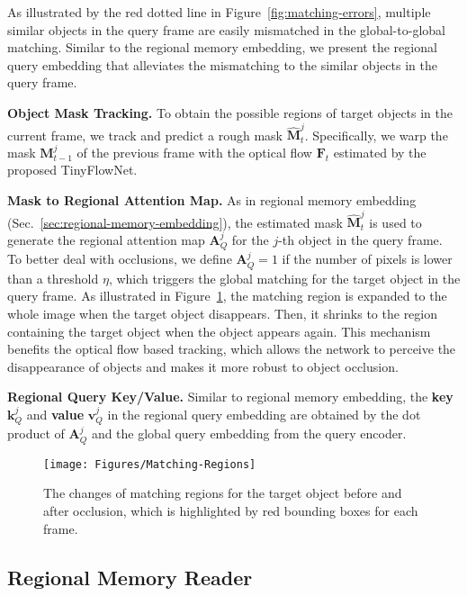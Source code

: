 \documentclass[final]{cvpr}
\begin{document}
As illustrated by the red dotted line in Figure~\ref{fig:matching-errors}, multiple similar objects in the query frame are easily mismatched in the global-to-global matching.
Similar to the regional memory embedding, we present the regional query embedding that alleviates the mismatching  to the similar objects in the query frame.

\noindent \textbf{Object Mask Tracking.}
To obtain the possible regions of target objects in the current frame, we track and predict a rough mask $\mathbf{\hat{M}}_t^j$.
Specifically, we warp the mask $\mathbf{M}_{t - 1}^j$ of the previous frame with the optical flow $\mathbf{F}_t$ estimated by the proposed TinyFlowNet.


\noindent \textbf{Mask to Regional Attention Map.}
As in regional memory embedding (Sec.~\ref{sec:regional-memory-embedding}), the estimated mask $\mathbf{\hat{M}}_t^j$ is used to generate the regional attention map $\mathbf{A}_Q^j$ for the $j$-th object in the query frame.
To better deal with occlusions, we define $\mathbf{A}_Q^j = 1$ if the number of pixels is lower than a threshold $\eta$, which triggers the global matching for the target object in the query frame.
As illustrated in Figure~\ref{fig:matching-regions}, the matching region is expanded to the whole image when the target object disappears.
Then, it shrinks to the region containing the target object when the object appears again.
This mechanism benefits the optical flow based tracking, which allows the network to perceive the disappearance of objects and makes it more robust to object occlusion.

\noindent \textbf{Regional Query Key/Value.}
Similar to regional memory embedding, the \textbf{key} $\mathbf{k}_Q^j$ and \textbf{value} $\mathbf{v}_Q^j$ in the regional query embedding are obtained by the dot product of $\mathbf{A}_Q^j$ and the global query embedding from the query encoder.

\begin{figure}
  \resizebox{\linewidth}{!} {
    \texttt{[image: Figures/Matching-Regions]}
  }
  \caption{The changes of matching regions for the target object before and after occlusion, which is highlighted by red bounding boxes for each frame.}
  \label{fig:matching-regions}
  \vspace{-2 mm}
\end{figure}

\subsection{Regional Memory Reader}
\end{document}
